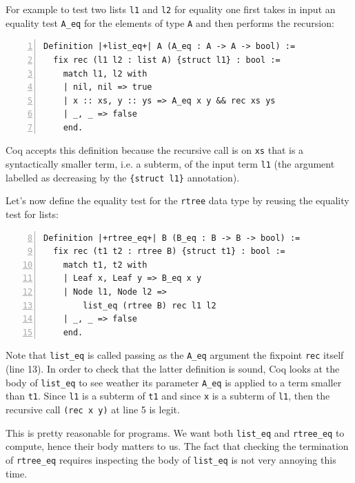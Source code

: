 \documentclass[sigplan,10pt,review]{acmart}\settopmatter{printfolios=true,printccs=false,printacmref=false}
\begin{document}
For example to test two lists \lstinline+l1+ and \lstinline+l2+ for
equality one first takes in input an equality test \lstinline+A_eq+
for the elements of type \lstinline+A+ and then performs the
recursion:

\begin{minipage}{\textwidth}\begin{lstlisting}[numbers=left]
Definition |+list_eq+| A (A_eq : A -> A -> bool) :=
  fix rec (l1 l2 : list A) {struct l1} : bool :=
    match l1, l2 with
    | nil, nil => true
    | x :: xs, y :: ys => A_eq x y && rec xs ys
    | _, _ => false
    end.
\end{lstlisting}\end{minipage}

\noindent
Coq accepts this definition because
the recursive call is on \lstinline+xs+ that is a syntactically
smaller term, i.e. a subterm, of the input term \lstinline+l1+ (the
argument labelled as decreasing by the \lstinline+{struct l1}+
annotation).

Let's now define the equality test for the \lstinline+rtree+ data type
by reusing the equality test for lists:

\begin{minipage}{\textwidth}\begin{lstlisting}[numbers=left,firstnumber=8]
Definition |+rtree_eq+| B (B_eq : B -> B -> bool) :=
  fix rec (t1 t2 : rtree B) {struct t1} : bool :=
    match t1, t2 with
    | Leaf x, Leaf y => B_eq x y
    | Node l1, Node l2 =>
        list_eq (rtree B) rec l1 l2
    | _, _ => false
    end.
\end{lstlisting}\end{minipage}

\noindent
Note that \lstinline+list_eq+ is called passing as the \lstinline+A_eq+
argument the fixpoint \lstinline+rec+ itself (line 13). In order to
check that the latter definition is sound, Coq looks at the body of
\lstinline+list_eq+ to see weather its parameter \lstinline+A_eq+ is
applied to a term smaller than \lstinline+t1+. Since
\lstinline+l1+ is a subterm of \lstinline+t1+ and since \lstinline+x+
is a subterm of \lstinline+l1+, then the recursive call
\lstinline+(rec x y)+ at line 5 is legit.

This is pretty reasonable for programs. We want both \lstinline+list_eq+
and \lstinline+rtree_eq+ to compute, hence their body matters to us.
The fact that checking the termination of \lstinline+rtree_eq+ requires
inspecting the body of \lstinline+list_eq+ is not very annoying this
time.
\end{document}
